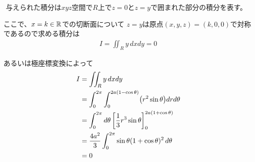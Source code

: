 \begin{ans*}
  ${}$
  与えられた積分は$xyz$空間で$R$上で$z=0$と$z=y$で囲まれた部分の積分を表す。

  ここで、$x = k\in\mathbb{R}$での切断面について
  $z=y$は原点$(x,y,z)=(k,0,0)$で対称であるので求める積分は
  \begin{gather}
    I = \iint_{R}y\,dxdy = 0
  \end{gather}
\end{ans*}
\begin{other*}
  あるいは極座標変換によって
  \begin{align}
    I
    &= \iint_{R}y\,dxdy \\
    &= \int_{0}^{2\pi}\int_{0}^{2a(1-\cos{\theta})}\bigl(r^2 \sin{\theta}\bigr)drd{\theta} \\
    &= \int_{0}^{2\pi}d{\theta} \left[\frac{1}{3}r^3 \sin{\theta}\right]_{0}^{2a(1+\cos{\theta})} \\
    &= \frac{4a^2}{3}\int_{0}^{2\pi} \sin{\theta}(1+\cos{\theta})^2\,d{\theta} \\
    &= 0
  \end{align}
\end{other*}

